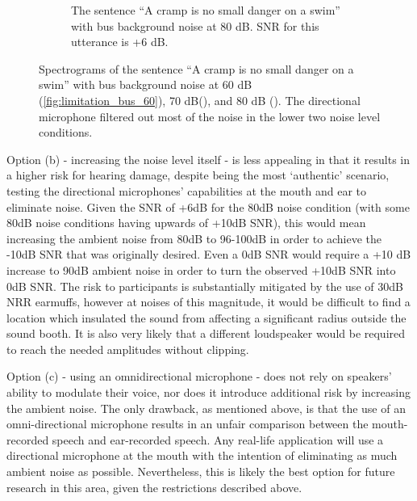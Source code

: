 \begin{figure}[h!]
\begin{center}
\begin{subfigure}{0.475\textwidth}
  \caption{The sentence ``A cramp is no small danger on a swim'' with bus background noise at 80 dB. SNR for this utterance is +6 dB.}
  \label{fig:limitation_bus_80}
\end{subfigure}
\end{center}
\caption{Spectrograms of the sentence ``A cramp is no small danger on a swim'' with bus background noise at 60 dB (\ref{fig:limitation_bus_60}), 70 dB(\DIFdelbeginFL \DIFdelFL{\ref{fig:limitation_bus_60}}\DIFdelendFL \DIFaddbeginFL \DIFaddFL{\ref{fig:limitation_bus_70}}\DIFaddendFL ), and 80 dB (\DIFdelbeginFL \DIFdelFL{\ref{fig:limitation_bus_60}}\DIFdelendFL \DIFaddbeginFL \DIFaddFL{\ref{fig:limitation_bus_80}}\DIFaddendFL ). The directional microphone filtered out most of the noise in the lower two noise level conditions.}
\label{fig:noise_level_limitation}
\end{figure}

Option (b) - increasing the noise level itself - is less appealing in that it results in a higher risk for hearing damage, despite being the most `authentic' scenario, testing the directional microphones' capabilities at the mouth and ear to eliminate noise.  Given the SNR of +6dB for the 80dB noise condition (with some 80dB noise conditions having upwards of +10dB SNR), this would mean increasing the ambient noise from 80dB to 96-100dB in order to achieve the -10dB SNR that was originally desired.  Even a 0dB SNR would require a +10 dB increase to 90dB ambient noise in order to turn the observed +10dB SNR into 0dB SNR. The risk to participants is substantially mitigated by the use of 30dB NRR earmuffs, however at noises of this magnitude, it would be difficult to find a location which insulated the sound from affecting a significant radius outside the sound booth.  It is also very likely that a different loudspeaker would be required to reach the needed amplitudes without clipping.

Option (c) - using an omnidirectional microphone - does not rely on speakers' ability to modulate their voice, nor does it introduce additional risk by increasing the ambient noise.  The only drawback, as mentioned above, is that the use of an omni-directional microphone results in an unfair comparison between the mouth-recorded speech and ear-recorded speech.  Any real-life application will use a directional microphone at the mouth with the intention of eliminating as much ambient noise as possible.  Nevertheless, this is likely the best option for future research in this area, given the restrictions described above.

